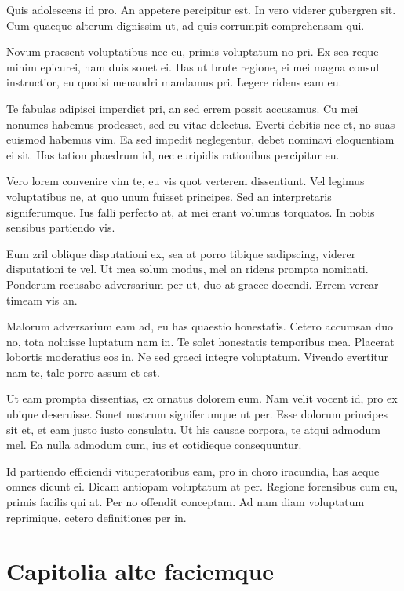 \documentclass[10pt,]{book}
\begin{document}
Quis adolescens id pro. An appetere percipitur est. In vero viderer
gubergren sit. Cum quaeque alterum dignissim ut, ad quis corrumpit
comprehensam qui.

Novum praesent voluptatibus nec eu, primis voluptatum no pri. Ex sea
reque minim epicurei, nam duis sonet ei. Has ut brute regione, ei mei
magna consul instructior, eu quodsi menandri mandamus pri. Legere ridens
eam eu.

Te fabulas adipisci imperdiet pri, an sed errem possit accusamus. Cu mei
nonumes habemus prodesset, sed cu vitae delectus. Everti debitis nec et,
no suas euismod habemus vim. Ea sed impedit neglegentur, debet nominavi
eloquentiam ei sit. Has tation phaedrum id, nec euripidis rationibus
percipitur eu.

Vero lorem convenire vim te, eu vis quot verterem dissentiunt. Vel
legimus voluptatibus ne, at quo unum fuisset principes. Sed an
interpretaris signiferumque. Ius falli perfecto at, at mei erant volumus
torquatos. In nobis sensibus partiendo vis.

Eum zril oblique disputationi ex, sea at porro tibique sadipscing,
viderer disputationi te vel. Ut mea solum modus, mel an ridens prompta
nominati. Ponderum recusabo adversarium per ut, duo at graece docendi.
Errem verear timeam vis an.

Malorum adversarium eam ad, eu has quaestio honestatis. Cetero accumsan
duo no, tota noluisse luptatum nam in. Te solet honestatis temporibus
mea. Placerat lobortis moderatius eos in. Ne sed graeci integre
voluptatum. Vivendo evertitur nam te, tale porro assum et est.

Ut eam prompta dissentias, ex ornatus dolorem eum. Nam velit vocent id,
pro ex ubique deseruisse. Sonet nostrum signiferumque ut per. Esse
dolorum principes sit et, et eam justo iusto consulatu. Ut his causae
corpora, te atqui admodum mel. Ea nulla admodum cum, ius et cotidieque
consequuntur.

Id partiendo efficiendi vituperatoribus eam, pro in choro iracundia, has
aeque omnes dicunt ei. Dicam antiopam voluptatum at per. Regione
forensibus cum eu, primis facilis qui at. Per no offendit conceptam. Ad
nam diam voluptatum reprimique, cetero definitiones per in.

\hypertarget{capitolia-alte-faciemque}{%
\chapter{Capitolia alte faciemque}\label{capitolia-alte-faciemque}}
\end{document}
